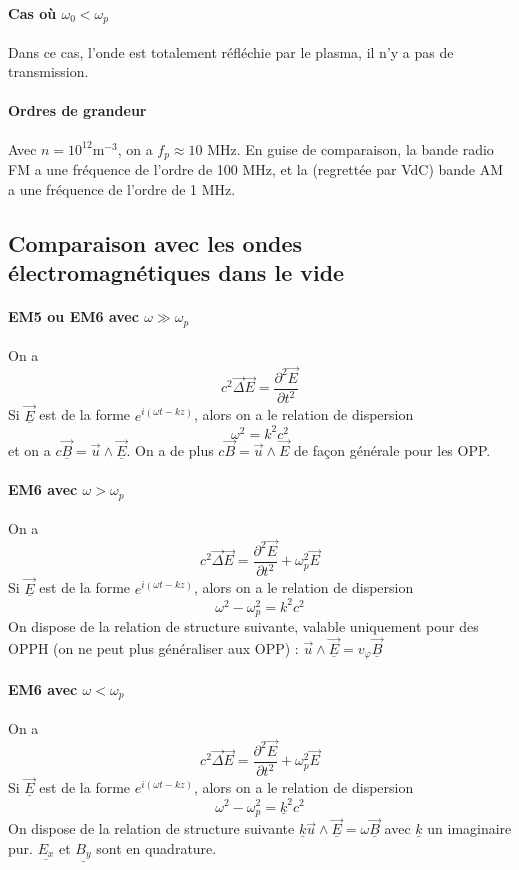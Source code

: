 \documentclass[french]{book}
\theoremstyle{plain}
\theoremstyle{definition}
\theoremstyle{remark}
\begin{document}
\paragraph{Cas où $\omega_0<\omega_p$} Dans ce cas, l'onde est totalement réfléchie par le plasma, il n'y a pas de transmission.
\paragraph{Ordres de grandeur} Avec $n=10^{12}$m$^{-3}$, on a $f_p\approx10$ MHz. En guise de comparaison, la bande radio FM a une fréquence de l'ordre de 100 MHz, et la (regrettée par VdC) bande AM a une fréquence de l'ordre de 1 MHz.
\subsection{Comparaison avec les ondes électromagnétiques dans le vide}
\paragraph{EM5 ou EM6 avec $\omega\gg\omega_p$} On a $$c^2\overrightarrow{\Delta}\overrightarrow{E}=\frac{\partial^2\overrightarrow{E}}{\partial t^2}$$ Si $\underline{\overrightarrow{E}}$ est de la forme $e^{i(\omega t-kz)}$, alors on a le relation de dispersion $$\omega^2=k^2c^2$$ et on a $c\underline{\overrightarrow{B}}=\overrightarrow{u}\wedge\underline{\overrightarrow{E}}$. On a de plus $c\overrightarrow{B}=\overrightarrow{u}\wedge\overrightarrow{E}$ de façon générale pour les OPP.
\paragraph{EM6 avec $\omega>\omega_p$} On a $$c^2\overrightarrow{\Delta}\overrightarrow{E}=\frac{\partial^2\overrightarrow{E}}{\partial t^2}+\omega_p^2\overrightarrow{E}$$ Si $\underline{\overrightarrow{E}}$ est de la forme $e^{i(\omega t-kz)}$, alors on a le relation de dispersion $$\omega^2-\omega_p^2=k^2c^2$$ On dispose de la relation de structure suivante, valable uniquement pour des OPPH (on ne peut plus généraliser aux OPP) :  $\overrightarrow{u}\wedge\underline{\overrightarrow{E}}=v_\varphi\underline{\overrightarrow{B}}$
\paragraph{EM6 avec $\omega<\omega_p$} On a $$c^2\overrightarrow{\Delta}\overrightarrow{E}=\frac{\partial^2\overrightarrow{E}}{\partial t^2}+\omega_p^2\overrightarrow{E}$$ Si $\underline{\overrightarrow{E}}$ est de la forme $e^{i(\omega t-kz)}$, alors on a le relation de dispersion $$\omega^2-\omega_p^2=\underline{k}^2c^2$$ On dispose de la relation de structure suivante $\underline{k}\overrightarrow{u}\wedge\underline{\overrightarrow{E}}=\omega\underline{\overrightarrow{B}}$ avec $\underline{k}$ un imaginaire pur. $\underline{E_x}$ et $\underline{B_y}$ sont en quadrature.
\end{document}
